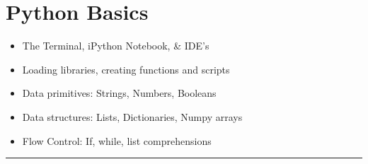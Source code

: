 %
%
%
\chapter{Python Basics}
\label{basics} %
 \vspace*{-2.0cm}
\begin{flushright}
	\parbox{8cm}
		{
		\begin{flushright}%
		\vspace*{5mm}
		\begin{itemize}\color[RGB]{0,128,128}
		\item The Terminal, iPython Notebook, \& IDE's 
		\item Loading libraries, creating functions and scripts
		\item Data primitives: Strings, Numbers, Booleans
		\item Data structures: Lists, Dictionaries, Numpy arrays
		\item Flow Control: If, while, list comprehensions
		\end{itemize}
		\vspace*{5mm}
		\end{flushright}
		}
\end{flushright}
\rule{\textwidth}{0.75pt}
